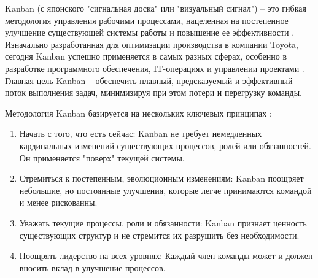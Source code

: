 Kanban (с японского "сигнальная доска" или "визуальный сигнал") – это гибкая методология управления рабочими процессами, нацеленная на постепенное улучшение существующей системы работы и повышение ее эффективности \cite{kanban1}. Изначально разработанная для оптимизации производства в компании Toyota, сегодня Kanban успешно применяется в самых разных сферах, особенно в разработке программного обеспечения, IT-операциях и управлении проектами \cite{kanban4}. Главная цель Kanban – обеспечить плавный, предсказуемый и эффективный поток выполнения задач, минимизируя при этом потери и перегрузку команды.

Методология Kanban базируется на нескольких ключевых принципах \cite{website_kanbanuniversity1}:
\begin{enumerate}
	\item Начать с того, что есть сейчас: Kanban не требует немедленных кардинальных изменений существующих процессов, ролей или обязанностей. Он применяется "поверх" текущей системы.
	\item Стремиться к постепенным, эволюционным изменениям: Kanban поощряет небольшие, но постоянные улучшения, которые легче принимаются командой и менее рискованны.
	\item Уважать текущие процессы, роли и обязанности: Kanban признает ценность существующих структур и не стремится их разрушить без необходимости.
	\item Поощрять лидерство на всех уровнях: Каждый член команды может и должен вносить вклад в улучшение процессов.
\end{enumerate}

